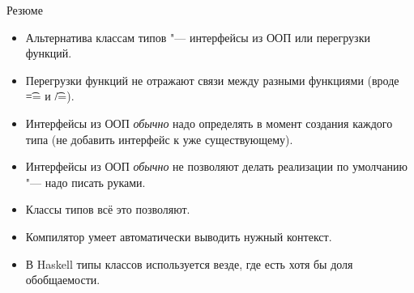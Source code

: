 \begin{frame}[fragile]{Резюме}
	\begin{itemize}
		\item Альтернатива классам типов "--- интерфейсы из ООП или перегрузки функций.
		\item Перегрузки функций не отражают связи между разными функциями (вроде \t{==} и \t{/=}).
		\item Интерфейсы из ООП \textit{обычно} надо определять в момент создания каждого типа (не добавить интерфейс к уже существующему).
		\item Интерфейсы из ООП \textit{обычно} не позволяют делать реализации по умолчанию "--- надо писать руками.
		\item Классы типов всё это позволяют.
		\item Компилятор умеет автоматически выводить нужный контекст.
		\item В Haskell типы классов используется везде, где есть хотя бы доля обобщаемости.
	\end{itemize}
\end{frame}
